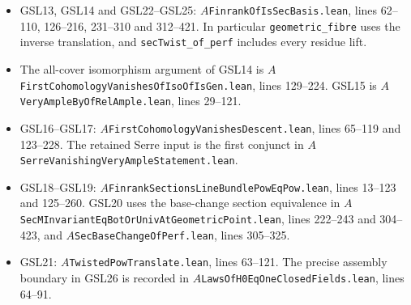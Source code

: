 \documentclass[11pt,a4paper]{article}
\numberwithin{equation}{section}
\theoremstyle{remark}\newtheorem{remark}[theorem]{Remark}
\begin{document}
{\begin{itemize}
 lines 24--50, and
 $C$\texttt{Exists\allowbreak Finite\allowbreak Projective\allowbreak Cech\allowbreak Complex\allowbreak Line\allowbreak Bundle.\allowbreak lean},
 lines 19--43.  The last geometric producer remains a premise.
 \item GSL13, GSL14 and GSL22--GSL25:
 $A$\texttt{Finrank\allowbreak Of\allowbreak Is\allowbreak Sec\allowbreak Basis.\allowbreak lean}, lines 62--110,
 126--216, 231--310 and 312--421.  In particular
 \texttt{geometric\_\allowbreak fibre} uses the inverse translation,
 and \texttt{sec\allowbreak Twist\_\allowbreak of\_\allowbreak perf} includes every residue lift.
 \item The all-cover isomorphism argument of GSL14 is
 $A$\texttt{First\allowbreak Cohomology\allowbreak Vanishes\allowbreak Of\allowbreak Iso\allowbreak Of\allowbreak Is\allowbreak Gen.\allowbreak lean},
 lines 129--224.  GSL15 is
 $A$\texttt{Very\allowbreak Ample\allowbreak By\allowbreak Of\allowbreak Rel\allowbreak Ample.\allowbreak lean}, lines 29--121.
 \item GSL16--GSL17:
 $A$\texttt{First\allowbreak Cohomology\allowbreak Vanishes\allowbreak Descent.\allowbreak lean},
 lines 65--119 and 123--228.  The retained Serre input is the
 first conjunct in
 $A$\texttt{Serre\allowbreak Vanishing\allowbreak Very\allowbreak Ample\allowbreak Statement.\allowbreak lean}.
 \item GSL18--GSL19:
 $A$\texttt{Finrank\allowbreak Sections\allowbreak Line\allowbreak Bundle\allowbreak Pow\allowbreak Eq\allowbreak Pow.\allowbreak lean},
 lines 13--123 and 125--260.  GSL20 uses the base-change
 section equivalence in
 $A$\texttt{Sec\allowbreak MInvariant\allowbreak Eq\allowbreak Bot\allowbreak Or\allowbreak Univ\allowbreak At\allowbreak Geometric\allowbreak Point.\allowbreak lean},
 lines 222--243 and 304--423, and
 $A$\texttt{Sec\allowbreak Base\allowbreak Change\allowbreak Of\allowbreak Perf.\allowbreak lean}, lines 305--325.
 \item GSL21:
 $A$\texttt{Twisted\allowbreak Pow\allowbreak Translate.\allowbreak lean}, lines 63--121.
 The precise assembly boundary in GSL26 is recorded in
 $A$\texttt{Laws\allowbreak Of\allowbreak H0Eq\allowbreak One\allowbreak Closed\allowbreak Fields.\allowbreak lean}, lines 64--91.
\end{itemize}

}
\end{document}
